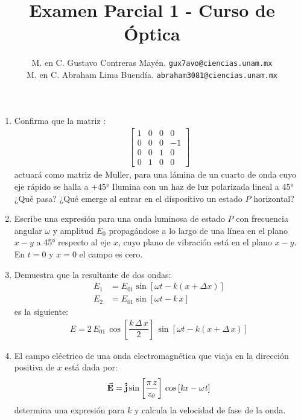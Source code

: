 \documentclass[14pt]{extarticle}
\author{\normalsize{M. en C. Gustavo Contreras Mayén.} \quad \normalsize{\texttt{gux7avo@ciencias.unam.mx}} \\
\normalsize{M. en C. Abraham Lima Buendía.} \quad \normalsize{\texttt{abraham3081@ciencias.unam.mx}}}
\title{\vspace*{-2cm} Examen Parcial 1 - Curso de Óptica}
\date{ }
\begin{document}
\maketitle
\begin{enumerate}
\item Confirma que la matriz :
\begin{align*}
\begin{bmatrix}
1 & 0 & 0 & 0 \\
0 & 0 & 0 & -1 \\
0 & 0 & 1 & 0 \\
0 & 1 & 0 & 0        
\end{bmatrix}
\end{align*}
actuará como matriz de Muller, para una lámina de un cuarto de onda cuyo eje rápido se halla a +\ang{45} Ilumina con un haz de luz polarizada lineal a \ang{45} ¿Qué pasa? ¿Qué emerge al entrar en el dispositivo un estado $P$ horizontal? 
\item Escribe una expresión para una onda luminosa de estado $P$ con frecuencia angular $\omega$ y amplitud $E_{0}$ propagándose a lo largo de una línea en el plano $x-y$ a \ang{45} respecto al eje $x$, cuyo plano de vibración está en el plano $x-y$. En $t = 0$ y $ x = 0$ el campo es cero.
\item Demuestra que la resultante de dos ondas:
\begin{align*}
E_{1} &= E_{01} \sin \left[ \omega t - k \left( x + \Delta x \right) \right] \\[0.5em]
E_{2} &= E_{01} \sin \left[ \omega t - k \, x \right]
\end{align*}
es la siguiente:
\begin{align*}
E = 2\, E_{01} \, \cos \left[ \dfrac{k \, \Delta \, x}{2} \right] \, \sin \left[ \omega t - k \left( x + \Delta \, x \right) \right]
\end{align*}
\item El campo eléctrico de una onda electromagnética que viaja en la dirección positiva de $x$ está dada por:
\begin{align*}
\va{E} = \vu{j} \, \mathrm{ \sin \left[ \mathit{\dfrac{\pi \, z}{z_{0}}} \right] \, \cos \left[ \mathit{ k x - \omega t} \right]}
\end{align*}
determina una expresión para $k$ y calcula la velocidad de fase de la onda. 
\end{enumerate}
\end{document}
